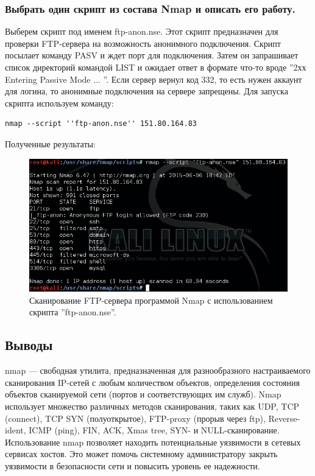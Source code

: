 \documentclass[a4paper, 14pt]{article}				%
\begin{document}
\newpage
\subsubsection{Выбрать один скрипт из состава Nmap и описать его работу.}

Выберем скрипт под именем ftp-anon.nse. Этот скрипт предназначен для проверки FTP-сервера на возможность анонимного подключения. Скрипт посылает команду PASV и ждет порт для подключения. Затем он запрашивает список директорий командой LIST и ожидает ответ в формате что-то вроде ''2хх Entering Passive Mode ... ''. Если сервер вернул код 332, то есть нужен аккаунт для логина, то анонимные подключения на сервере запрещены.
Для запуска скрипта используем команду:
\begin{Verbatim}[frame=single]
nmap --script ''ftp-anon.nse'' 151.80.164.83
\end{Verbatim}
Полученные результаты:
\begin{figure}[h!]
\centering
\includegraphics[width=\textwidth]{rsrc/nmap_nse_ftp}
\caption{Сканирование FTP-сервера программой Nmap с использованием скрипта ''ftp-anon.nse''.}
\end{figure}


\subsection{Выводы}
nmap — свободная утилита, предназначенная для разнообразного настраиваемого сканирования IP-сетей с любым количеством объектов, определения состояния объектов сканируемой сети (портов и соответствующих им служб). Nmap использует множество различных методов сканирования, таких как UDP, TCP (connect), TCP SYN (полуоткрытое), FTP-proxy (прорыв через ftp), Reverse-ident, ICMP (ping), FIN, ACK, Xmas tree, SYN- и NULL-сканирование. Использование nmap позволяет находить потенциальные уязвимости в сетевых сервисах хостов. Это может помочь системному администратору закрыть уязвимости в безопасности сети и повысить уровень ее надежности.
\end{document}
